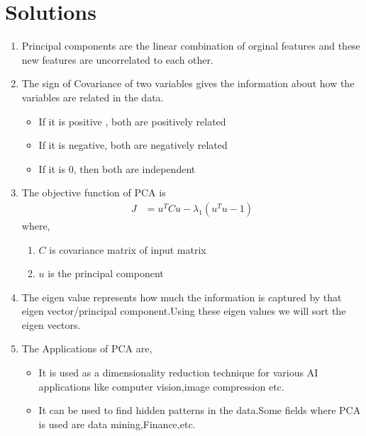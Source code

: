 \documentclass[journal,12pt,onecolumn]{IEEEtran}
\providecommand{\brak}[1]{\ensuremath{\left(#1\right)}}
\theoremstyle{remark}
\numberwithin{equation}{section}
\begin{document}
	    \section{Solutions}
             \begin{enumerate}
	      \item Principal components are the linear combination of orginal features and these new features are uncorrelated to each other.
	      \item The sign of Covariance of two variables gives the information about how the variables are related in the data.
		      \begin{itemize}
		        \item If it is positive , both are positively related
		        \item If it is negative, both are negatively related
		        \item If it is $0$, then both are independent
		      \end{itemize}
	      \item The objective function of PCA is 
		      \begin{align}
                        J  &=  u^TCu - \lambda_1\brak{u^Tu - 1}
                     \end{align}
                         where, 
			     \begin{enumerate}
			        \item $C$ is covariance matrix of input matrix
			        \item $u$ is the principal component
			     \end{enumerate}
	      \item The eigen value represents how much the information is captured by that eigen vector/principal component.Using these eigen values we will sort the eigen vectors.
	      \item The Applications of PCA are,
		      \begin{itemize}
		        \item It is used as a dimensionality reduction technique for various AI applications like computer vision,image compression etc.
		        \item It can be used to find hidden patterns in the data.Some fields where PCA is used are data mining,Finance,etc.
		      \end{itemize}
	      \end{enumerate}
	  
\end{document}
